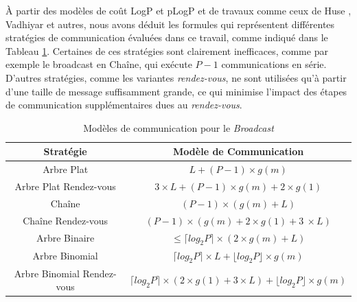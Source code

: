 À partir des modèles de coût LogP \cite{Culler96} et pLogP \cite{Kielmann01}
et de travaux comme ceux de Huse \cite{Huse99}, Vadhiyar \cite{Vadhiyar00}
et autres, nous avons déduit les formules qui représentent différentes
stratégies de communication évaluées dans ce travail, comme indiqué
dans le Tableau \ref{table:bcast_models_classique}. Certaines de
ces stratégies sont clairement inefficaces, comme par exemple le broadcast
en Chaîne, qui exécute $P-1$ communications en série. D'autres stratégies,
comme les variantes \emph{rendez-vous}, ne sont utilisées qu'à partir
d'une taille de message suffisamment grande, ce qui minimise l'impact
des étapes de communication supplémentaires dues au \emph{rendez-vous}.

%
\begin{table}[h]
	\centering
		\begin{tabular}{|c|c|}
			\hline 
			\textbf{\small Stratégie} & \textbf{\small Modèle de Communication}\tabularnewline
			\hline
			\hline 
			{\small Arbre Plat} & {\small $L+(P-1)\times g(m)$}\tabularnewline
			\hline 
			{\small Arbre Plat Rendez-vous} & {\small $3\times L+(P-1)\times g(m)+2\times g(1)$}\tabularnewline
			\hline 
			{\small Chaîne} & {\small $(P-1)\times(g(m)+L)$}\tabularnewline
			\hline 
			{\small Chaîne Rendez-vous} & {\small $(P-1)\times(g(m)+2\times g(1)+3\ \times L)$}\tabularnewline
			\hline 
			{\small Arbre Binaire} & {\small $\leq\lceil log_{2}P\rceil\times(2\times g(m)+L)$}\tabularnewline
			\hline 
			{\small Arbre Binomial} & {\small $\lceil log_{2}P\rceil\times L+\lfloor log_{2}P\rfloor\times g(m)$}\tabularnewline
			\hline 
			{\small Arbre Binomial Rendez-vous} & {\small $\lceil log_{2}P\rceil\times(2\times g(1)+3\times L)+\lfloor log_{2}P\rfloor\times g(m)$}\tabularnewline
			\hline
		\end{tabular}
		
	
	\caption{\label{table:bcast_models_classique}Modèles de communication pour
		le \emph{Broadcast}}
	
\end{table}


